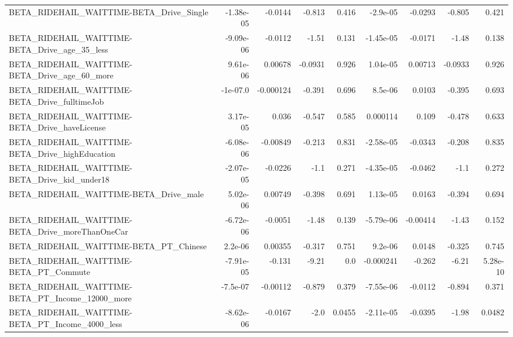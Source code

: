 \begin{tabular}{lrrrrrrrr}
BETA\_RIDEHAIL\_WAITTIME-BETA\_Drive\_Single           &   -1.38e-05 &      -0.0144 &   -0.813 &    0.416 &   -2.9e-05 &     -0.0293 &       -0.805 &         0.421 \\
BETA\_RIDEHAIL\_WAITTIME-BETA\_Drive\_age\_35\_less      &   -9.09e-06 &      -0.0112 &    -1.51 &    0.131 &  -1.45e-05 &     -0.0171 &        -1.48 &         0.138 \\
BETA\_RIDEHAIL\_WAITTIME-BETA\_Drive\_age\_60\_more      &    9.61e-06 &      0.00678 &  -0.0931 &    0.926 &   1.04e-05 &     0.00713 &      -0.0933 &         0.926 \\
BETA\_RIDEHAIL\_WAITTIME-BETA\_Drive\_fulltimeJob      &    -1e-07.0 &    -0.000124 &   -0.391 &    0.696 &    8.5e-06 &      0.0103 &       -0.395 &         0.693 \\
BETA\_RIDEHAIL\_WAITTIME-BETA\_Drive\_haveLicense      &    3.17e-05 &        0.036 &   -0.547 &    0.585 &   0.000114 &       0.109 &       -0.478 &         0.633 \\
BETA\_RIDEHAIL\_WAITTIME-BETA\_Drive\_highEducation    &   -6.08e-06 &     -0.00849 &   -0.213 &    0.831 &  -2.58e-05 &     -0.0343 &       -0.208 &         0.835 \\
BETA\_RIDEHAIL\_WAITTIME-BETA\_Drive\_kid\_under18      &   -2.07e-05 &      -0.0226 &     -1.1 &    0.271 &  -4.35e-05 &     -0.0462 &         -1.1 &         0.272 \\
BETA\_RIDEHAIL\_WAITTIME-BETA\_Drive\_male             &    5.02e-06 &      0.00749 &   -0.398 &    0.691 &   1.13e-05 &      0.0163 &       -0.394 &         0.694 \\
BETA\_RIDEHAIL\_WAITTIME-BETA\_Drive\_moreThanOneCar   &   -6.72e-06 &      -0.0051 &    -1.48 &    0.139 &  -5.79e-06 &    -0.00414 &        -1.43 &         0.152 \\
BETA\_RIDEHAIL\_WAITTIME-BETA\_PT\_Chinese             &     2.2e-06 &      0.00355 &   -0.317 &    0.751 &    9.2e-06 &      0.0148 &       -0.325 &         0.745 \\
BETA\_RIDEHAIL\_WAITTIME-BETA\_PT\_Commute             &   -7.91e-05 &       -0.131 &    -9.21 &      0.0 &  -0.000241 &      -0.262 &        -6.21 &      5.28e-10 \\
BETA\_RIDEHAIL\_WAITTIME-BETA\_PT\_Income\_12000\_more   &    -7.5e-07 &     -0.00112 &   -0.879 &    0.379 &  -7.55e-06 &     -0.0112 &       -0.894 &         0.371 \\
BETA\_RIDEHAIL\_WAITTIME-BETA\_PT\_Income\_4000\_less    &   -8.62e-06 &      -0.0167 &     -2.0 &   0.0455 &  -2.11e-05 &     -0.0395 &        -1.98 &        0.0482 \\

\end{tabular}

